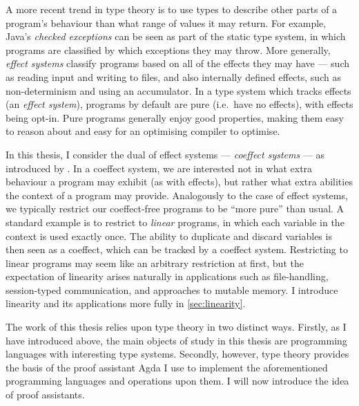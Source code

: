 A more recent trend in type theory is to use types to describe other parts of a
program's behaviour than what range of values it may return.
For example, Java's \emph{checked exceptions} can be seen as part of the static
type system, in which programs are classified by which exceptions they may
throw.
More generally, \emph{effect systems} classify programs based on all of the
effects they may have --- such as reading input and writing to files, and also
internally defined effects, such as non-determinism and using an accumulator.
In a type system which tracks effects (an \emph{effect system}), programs by
default are pure (i.e.\ have no effects), with effects being opt-in.
Pure programs generally enjoy good properties, making them easy to reason about
and easy for an optimising compiler to optimise.

In this thesis, I consider the dual of effect systems ---
\emph{coeffect systems} --- as introduced by \citet{POM14}.
In a coeffect system, we are interested not in what extra behaviour a program
may exhibit (as with effects), but rather what extra abilities the context of a
program may provide.
Analogously to the case of effect systems, we typically restrict our
coeffect-free programs to be ``more pure'' than usual.
A standard example is to restrict to \emph{linear} programs, in which each
variable in the context is used exactly once.
The ability to duplicate and discard variables is then seen as a coeffect, which
can be tracked by a coeffect system.
Restricting to linear programs may seem like an arbitrary restriction at first,
but the expectation of linearity arises naturally in applications such as
file-handling, session-typed communication, and approaches to mutable memory.
I introduce linearity and its applications more fully in \cref{sec:linearity}.



The work of this thesis relies upon type theory in two distinct ways.
Firstly, as I have introduced above, the main objects of study in this thesis
are programming languages with interesting type systems.
Secondly, however, type theory provides the basis of the proof assistant Agda I
use to implement the aforementioned programming languages and operations upon
them.
I will now introduce the idea of proof assistants.

